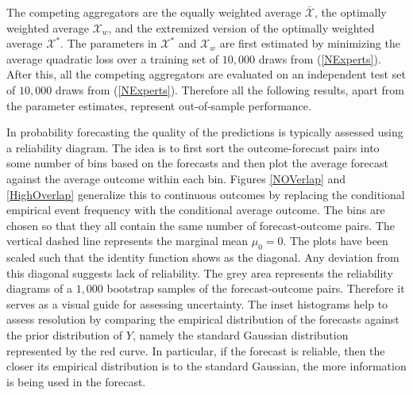 \documentclass[11pt]{article}
\theoremstyle{definition}
\theoremstyle{definition}
\begin{document}
The competing aggregators are the equally weighted average $\bar{\mathcal{X}}$, the optimally weighted average $\mathcal{X}_w$, and the extremized version of the optimally weighted average $\mathcal{X}^*$. The parameters in $\mathcal{X}^*$ and  $\mathcal{X}_w$ are first estimated by minimizing the average quadratic loss over a training set of $10,000$ draws from (\ref{NExperts}).  After this, all the competing aggregators are evaluated on an independent test set of $10,000$ draws from (\ref{NExperts}). 
Therefore all the following results, apart from the parameter estimates, represent out-of-sample performance. 



In probability forecasting the quality of the predictions is typically assessed using a reliability diagram. The idea is to first sort the outcome-forecast pairs into some number of bins based on the forecasts and then plot the average forecast against the average outcome within each bin. Figures \ref{NOVerlap} and  \ref{HighOverlap}  generalize this to continuous outcomes by replacing the conditional empirical event frequency with the conditional average outcome. The bins are chosen so that they all contain the same number of forecast-outcome pairs. The vertical dashed line represents the marginal mean $\mu_0 = 0$.  The plots have been scaled such that the identity function shows as the diagonal. Any deviation from this diagonal suggests lack of reliability. The grey area represents the reliability diagrams of a $1,000$ bootstrap samples of the forecast-outcome pairs. Therefore it serves as a visual guide for assessing uncertainty. The inset histograms help to assess resolution by comparing the empirical distribution of the forecasts against the prior distribution of $Y$, namely the standard Gaussian distribution represented by the red curve. In particular, if the forecast is reliable, then the closer its empirical distribution is to the standard Gaussian, the more information is being used in the forecast. 
\end{document}
